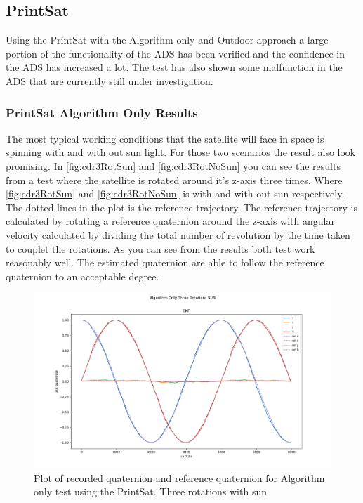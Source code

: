 \subsection{PrintSat}
Using the PrintSat with the Algorithm only and Outdoor approach a large portion of the functionality of the ADS has been verified and the confidence in the ADS has increased a lot. The test has also shown some malfunction in the ADS that are currently still under investigation. 

\subsubsection{PrintSat Algorithm Only Results}
The most typical working conditions that the satellite will face in space is spinning with and with out sun light. For those two scenarios the result also look promising. In \autoref{fig:cdr3RotSun} and \autoref{fig:cdr3RotNoSun} you can see the results from a test where the satellite is rotated around it's z-axis three times. Where \autoref{fig:cdr3RotSun} and \autoref{fig:cdr3RotNoSun} is with and with out sun respectively. The dotted lines in the plot is the reference trajectory. The reference trajectory is calculated by rotating a reference quaternion around the z-axis with angular velocity calculated by dividing the total number of revolution by the time taken to couplet the rotations. As you can see from the results both test work reasonably well. The estimated quaternion are able to follow the reference quaternion to an acceptable degree. 

\begin{figure}[tbp]
	\centering
	\includegraphics[width=1\columnwidth]{./Pictures/cdrRun3ThreeRotationsSun}
	\caption{Plot of recorded quaternion and reference quaternion for Algorithm only test using the PrintSat. Three rotations with sun}
	\label{fig:cdr3RotSun}
\end{figure}               

